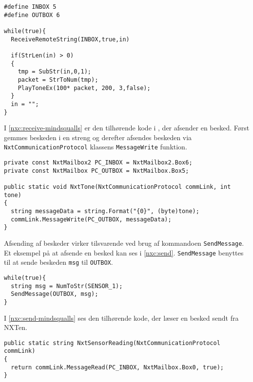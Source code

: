 \begin{lstlisting}[style=c,label=nxc:receive,caption={Et eksempel på at modtage beskeder over Bluetooth.}]
#define INBOX 5
#define OUTBOX 6

while(true){
  ReceiveRemoteString(INBOX,true,in)
  
  if(StrLen(in) > 0)
  {
    tmp = SubStr(in,0,1);
    packet = StrToNum(tmp);
    PlayToneEx(100* packet, 200, 3,false);
  }
  in = "";
}
\end{lstlisting}

I \cref{nxc:receive-mindsqualls} er den tilhørende kode i \mindsqualls, der afsender en besked.
Først gemmes beskeden i en streng og derefter afsendes beskeden via \lstinline[style=csharp]!NxtCommunicationProtocol! klassens \lstinline[style=csharp]!MessageWrite! funktion.

\begin{lstlisting}[style=c,breaklines=true, label=nxc:receive-mindsqualls,caption={\mindsqualls kode der afsender en besked.}]
private const NxtMailbox2 PC_INBOX = NxtMailbox2.Box6;
private const NxtMailbox PC_OUTBOX = NxtMailbox.Box5;

public static void NxtTone(NxtCommunicationProtocol commLink, int tone)
{
  string messageData = string.Format("{0}", (byte)tone);
  commLink.MessageWrite(PC_OUTBOX, messageData);
}
\end{lstlisting}

Afsending af beskeder virker tilsvarende ved brug af kommandoen \lstinline[style=c]|SendMessage|.
Et eksempel på at afsende en besked kan ses i \cref{nxc:send}.
\lstinline[style=c]|SendMessage| benyttes til at sende beskeden \lstinline[style=c]|msg| til \lstinline[style=c]!OUTBOX!.

\begin{lstlisting}[style=c,label=nxc:send,caption={Eksempel på afsending af besked.}]
while(true){
  string msg = NumToStr(SENSOR_1);
  SendMessage(OUTBOX, msg);
}
\end{lstlisting}

I \cref{nxc:send-mindsqualls} ses den tilhørende \mindsqualls kode, der læser en besked sendt fra NXTen.

\begin{lstlisting}[style=c,breaklines=true,label=nxc:send-mindsqualls,caption={\mindsqualls kode der læser en besked sendt fra NXT'en.}]
public static string NxtSensorReading(NxtCommunicationProtocol commLink)
{
  return commLink.MessageRead(PC_INBOX, NxtMailbox.Box0, true);
}
\end{lstlisting}
